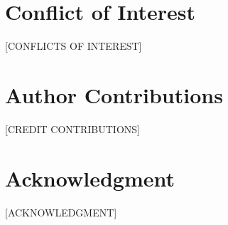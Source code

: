 \documentclass[journal]{IEEEtran}
\begin{document}
\section*{Conflict of Interest}
[CONFLICTS OF INTEREST]

\section*{Author Contributions}
[CREDIT CONTRIBUTIONS]

\section*{Acknowledgment}
[ACKNOWLEDGMENT]

%
%
%
%
%
\end{document}
